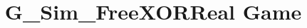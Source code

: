 \documentclass[a3paper]{article}
\title{G_Sim_FreeXORReal Game}
\theoremstyle{definition}
\begin{document}
\maketitle
\begin{center}

\end{center}
\begin{pchstack}

\pchspace
\end{pchstack}
\end{document}
